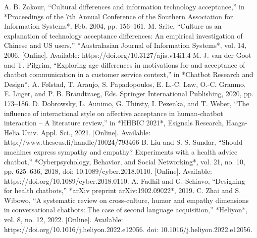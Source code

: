 \documentclass[conference]{IEEEtran}
\begin{document}
\begin{thebibliography}{00}
     A. B. Zakour, ``Cultural differences and information technology acceptance,'' in *Proceedings of the 7th Annual Conference of the Southern Association for Information Systems*, Feb. 2004, pp. 156–161.
     M. Srite, ``Culture as an explanation of technology acceptance differences: An empirical investigation of Chinese and US users,'' *Australasian Journal of Information Systems*, vol. 14, 2006. [Online]. Available: https://doi.org/10.3127/ajis.v14i1.4
	 M. J. van der Goot and T. Pilgrim, ``Exploring age differences in motivations for and acceptance of chatbot communication in a customer service context,'' in *Chatbot Research and Design*, A. Følstad, T. Araujo, S. Papadopoulos, E. L.-C. Law, O.-C. Granmo, E. Luger, and P. B. Brandtzaeg, Eds. Springer International Publishing, 2020, pp. 173–186.
	 D. Dobrowsky, L. Aunimo, G. Thirsty, I. Pezenka, and T. Weber, ``The influence of interactional style on affective acceptance in human-chatbot interaction – A literature review,'' in *HHBIC 2021*, Esignals Research, Haaga-Helia Univ. Appl. Sci., 2021. [Online]. Available: http://www.theseus.fi/handle/10024/793466
	 B. Liu and S. S. Sundar, ``Should machines express sympathy and empathy? Experiments with a health advice chatbot,'' *Cyberpsychology, Behavior, and Social Networking*, vol. 21, no. 10, pp. 625–636, 2018, doi: 10.1089/cyber.2018.0110. [Online]. Available: https://doi.org/10.1089/cyber.2018.0110.
	 A. Fadhil and G. Schiavo, ``Designing for health chatbots,'' *arXiv preprint arXiv:1902.09022*, 2019.
	 C. Zhai and S. Wibowo, ``A systematic review on cross-culture, humor and empathy dimensions in conversational chatbots: The case of second language acquisition,'' *Heliyon*, vol. 8, no. 12, 2022. [Online]. Available: https://doi.org/10.1016/j.heliyon.2022.e12056. doi: 10.1016/j.heliyon.2022.e12056.
\end{thebibliography}
\end{document}

